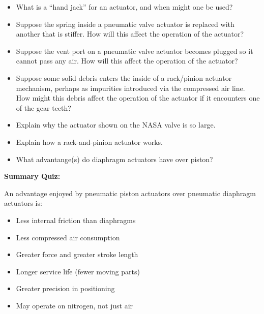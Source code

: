 \begin{itemize}
\item{} What is a ``hand jack'' for an actuator, and when might one be used?
\item{} Suppose the spring inside a pneumatic valve actuator is replaced with another that is stiffer.  How will this affect the operation of the actuator?
\item{} Suppose the vent port on a pneumatic valve actuator becomes plugged so it cannot pass any air.  How will this affect the operation of the actuator?
\item{} Suppose some solid debris enters the inside of a rack/pinion actuator mechanism, perhaps as impurities introduced via the compressed air line.  How might this debris affect the operation of the actuator if it encounters one of the gear teeth?
\item{} Explain why the actuator shown on the NASA valve is so large.
\item{} Explain how a rack-and-pinion actuator works.
\item{} What advantange(s) do diaphragm actuators have over piston?
\end{itemize}








\vfil \eject

\noindent
{\bf Summary Quiz:}

An advantage enjoyed by pneumatic piston actuators over pneumatic diaphragm actuators is:

\begin{itemize}
\item{} Less internal friction than diaphragms
\vskip 5pt 
\item{} Less compressed air consumption
\vskip 5pt 
\item{} Greater force and greater stroke length
\vskip 5pt 
\item{} Longer service life (fewer moving parts)
\vskip 5pt 
\item{} Greater precision in positioning
\vskip 5pt 
\item{} May operate on nitrogen, not just air
\end{itemize}






